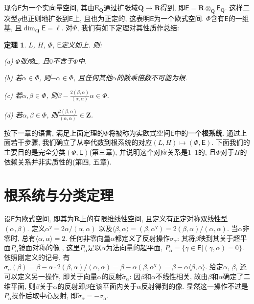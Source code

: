 \documentclass{ctexart}%
\newtheorem{theorem}{定理}
\theoremstyle{definition}
\theoremstyle{remark}
\begin{document}
现令$\mathsf{E}$为一个实向量空间, 其由$\mathrm{E}_{\mathbf{Q}}$通过扩张域$\mathbf{Q}\rightarrow \mathbf{R}$得到, 即$\mathsf{E}=\mathbf{R}\otimes_{\mathbf{Q}}\mathsf{E}_{\mathbf{Q}}$. 这样二次型$g$也正则地扩张到$\mathsf{E}$上, 且也为正定的, 这表明$\mathsf{E}$为一个欧式空间. $\Phi$含有$\mathsf{E}$的一组基, 且$\dim_{\mathbf{Q}}\mathsf{E}=\ell$. 对$\Phi$, 我们有如下定理对其性质作总结:

\begin{theorem} $L$, $H$, $\Phi$, $\mathsf{E}$定义如上. 则:

(a) $\Phi$张成$\mathsf{E}$, 且$0$不含于$\Phi$中.

(b) 若$\alpha \in \Phi$, 则$-\alpha \in\Phi$, 且任何其他$\alpha$的数乘倍数不可能为根.

(c) 若$\alpha, \beta \in \Phi$, 则$\beta- \frac{2(\beta,\alpha)}{(\alpha,\alpha)}\alpha \in \Phi$.

(d) 若$\alpha,\beta\in \Phi$, 则$\frac{2(\beta,\alpha)}{(\alpha,\alpha)}\in\mathbf{Z}$.
\end{theorem}

按下一章的语言, 满足上面定理的$\Phi$将被称为实欧式空间$\mathsf{E}$中的一个\textbf{根系统}. 通过上面若干步骤, 我们确立了从李代数到根系统的对应$(L,H)\mapsto (\Phi,\mathsf{E})$. 下面我们的主要目的是完全分类$(\Phi,\mathsf{E})$(第三章), 并说明这个对应关系是1\---1的, 且$\Phi$对于$H$的依赖关系并非实质性的(第四, 五章).



\section{根系统与分类定理}

设$\mathsf{E}$为欧式空间, 即其为$\mathbf{R}$上的有限维线性空间, 且定义有正定对称双线性型$(\alpha,\beta)$. 定义$\alpha^{\mathsf{v}}= 2\alpha/(\alpha,\alpha)$ 以及$\langle \beta,\alpha \rangle = (\beta,\alpha^{\mathsf{v}}) = 2(\beta,\alpha)/(\alpha,\alpha)$. 当$\alpha$非零时, 总有$\langle \alpha,\alpha\rangle = 2$. 任何非零向量$\alpha$都定义了反射操作$\sigma_\alpha$: 其将$\beta$映到其关于超平面$P_\alpha$镜面对称的像
, 这里$P_\alpha$是以$\alpha$为法向量的超平面, $P_\alpha=\{\gamma\in\mathsf{E}|(\gamma,\alpha)=0\}$. 依照刚定义的记号, 有$\sigma_\alpha(\beta) = \beta-\alpha\cdot 2(\beta,\alpha)/(\alpha,\alpha) = \beta - \alpha(\beta, \alpha^{\mathsf{v}}) = \beta-\alpha\langle\beta,\alpha\rangle$. 给定$\alpha$, $\beta$, 还可以定义另一操作, 即关于向量$\alpha$的反射$\widetilde{\sigma}_\alpha$: 因$\beta$和$\alpha$不线性相关, 故由$\beta$和$\alpha$确定了二维平面, 则$\beta$关于$\alpha$的反射即$\beta$在该平面内关于$\alpha$反射得到的像. 显然这一操作不过是$P_\alpha$操作后取中心反射, 即$\widetilde{\sigma}_\alpha = - \sigma_\alpha$.
\end{document}
